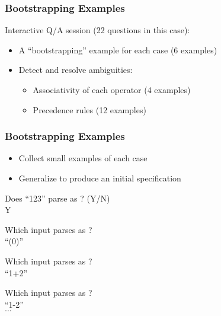 \begin{frame}[fragile]
\frametitle{Bootstrapping Examples}
  Interactive Q/A session (22 questions in this case):

\begin{itemize}
  \item A ``bootstrapping'' example for each case (6 examples)
  \item {Detect and resolve ambiguities:
    \begin{itemize}
      \item Associativity of each operator (4 examples)
      \item Precedence rules (12 examples)
    \end{itemize}
  }
\end{itemize}

\end{frame}

\begin{frame}[fragile]
\frametitle{Bootstrapping Examples}

\begin{itemize}
\item Collect small examples of each case
\item Generalize to produce an initial specification
\end{itemize}

\vspace{5mm}

\Q Does ``123'' parse as ? (Y/N)\\
\A Y
\vspace{2mm}

\Q Which input parses as ?\\
\A ``(0)''\\
\vspace{2mm}

\Q Which input parses as ?\\
\A ``1+2''\\
\vspace{2mm}

\Q Which input parses as ?\\
\A ``1-2''\\

$\dots$

\end{frame}

